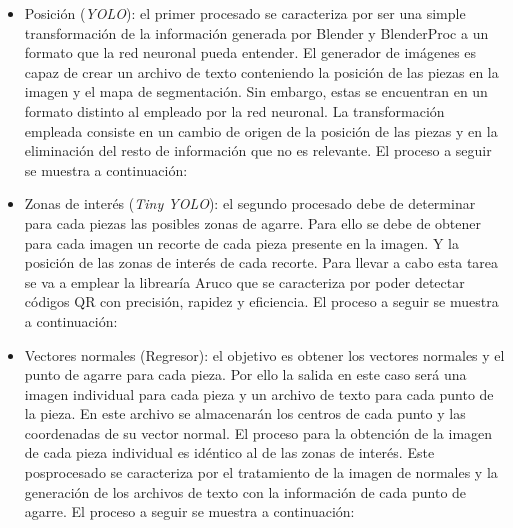 \begin{itemize}
\item Posición (\textit{YOLO}): el primer procesado se caracteriza por ser una simple transformación de la información generada por Blender y BlenderProc a un formato que la red neuronal pueda entender. El generador de imágenes es capaz de crear un archivo de texto conteniendo la posición de las piezas en la imagen y el mapa de segmentación. Sin embargo, estas se encuentran en un formato distinto al empleado por la red neuronal. La transformación empleada consiste en un cambio de origen de la posición de las piezas y en la eliminación del resto de información que no es relevante. El proceso a seguir se muestra a continuación:
\vspace{5 mm}

\vspace{5 mm}

\item Zonas de interés (\textit{Tiny YOLO}): el segundo procesado debe de determinar para cada piezas las posibles zonas de agarre. Para ello se debe de obtener para cada imagen un recorte de cada pieza presente en la imagen. Y la posición de las zonas de interés de cada recorte. Para llevar a cabo esta tarea se va a emplear la librearía Aruco que se caracteriza por poder detectar códigos QR con precisión, rapidez y eficiencia. El proceso a seguir se muestra a continuación:
\vspace{5 mm}

\vspace{5 mm}

\item Vectores normales (Regresor): el objetivo es obtener los vectores normales y el punto de agarre para cada pieza. Por ello la salida en este caso será una imagen individual para cada pieza y un archivo de texto para cada punto de la pieza. En este archivo se almacenarán los centros de cada punto y las coordenadas de su vector normal. El proceso para la obtención de la imagen de cada pieza individual es idéntico al de las zonas de interés. Este posprocesado se caracteriza por el tratamiento de la imagen de normales y la generación de los archivos de texto con la información de cada punto de agarre. El proceso a seguir se muestra a continuación:
\vspace{5 mm}

\vspace{5 mm}
\end{itemize}


